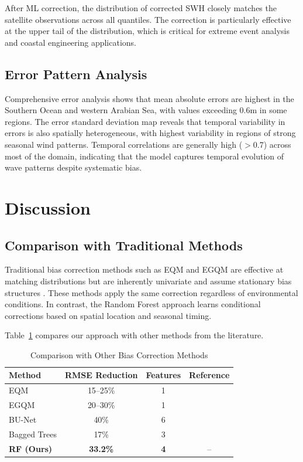 \documentclass[conference]{IEEEtran}
\begin{document}
After ML correction, the distribution of corrected SWH closely matches the satellite observations across all quantiles. The correction is particularly effective at the upper tail of the distribution, which is critical for extreme event analysis and coastal engineering applications.

\subsection{Error Pattern Analysis}

Comprehensive error analysis shows that mean absolute errors are highest in the Southern Ocean and western Arabian Sea, with values exceeding 0.6m in some regions. The error standard deviation map reveals that temporal variability in errors is also spatially heterogeneous, with highest variability in regions of strong seasonal wind patterns. Temporal correlations are generally high ($>$0.7) across most of the domain, indicating that the model captures temporal evolution of wave patterns despite systematic bias.

\section{Discussion}

\subsection{Comparison with Traditional Methods}

Traditional bias correction methods such as EQM and EGQM are effective at matching distributions but are inherently univariate and assume stationary bias structures \cite{lemos2020}. These methods apply the same correction regardless of environmental conditions. In contrast, the Random Forest approach learns conditional corrections based on spatial location and seasonal timing.

Table~\ref{tab:comparison} compares our approach with other methods from the literature.

\begin{table}[t]
\centering
\caption{Comparison with Other Bias Correction Methods}
\label{tab:comparison}
\begin{tabular}{@{}lccc@{}}
\toprule
Method & RMSE Reduction & Features & Reference \\ \midrule
EQM & 15--25\% & 1 & \cite{lemos2020} \\
EGQM & 20--30\% & 1 & \cite{lemos2020b} \\
BU-Net & 40\% & 6 & \cite{sun2022} \\
Bagged Trees & 17\% & 3 & \cite{ellenson2020} \\
\textbf{RF (Ours)} & \textbf{33.2\%} & \textbf{4} & -- \\
\bottomrule
\end{tabular}
\end{table}
\end{document}

